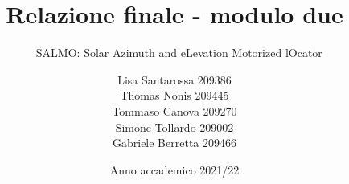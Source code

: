 \documentclass{layout/tudelft-report}
\begin{document}
\frontmatter

\title{Relazione finale - modulo due}

\subtitle{\qquad \qquad \ \; SALMO: \newline Solar Azimuth and eLevation Motorized lOcator}
\author{Lisa Santarossa 209386\\
        Thomas Nonis 209445\\
        Tommaso Canova 209270\\
        Simone Tollardo 209002\\
        Gabriele Berretta 209466
        }
        
\subject{Corso di Progettazione e Prototipazione di Sistemi Elettronici}
\date{Anno accademico 2021/22}


\makecover



\setcounter{tocdepth}{1}
\tableofcontents

\mainmatter











\end{document}
